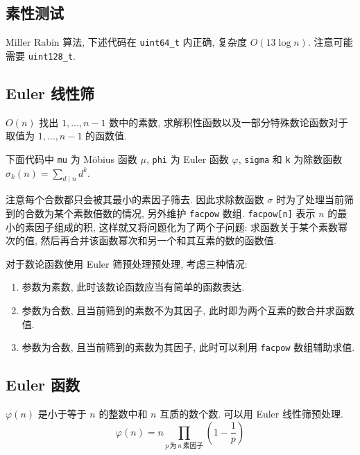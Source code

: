 \subsection{素性测试}
Miller Rabin 算法, 下述代码在 \lstinline{uint64_t} 内正确, 复杂度 $O(13\log n)$. 注意可能需要 \lstinline{uint128_t}.


\subsection{Euler 线性筛}
$O(n)$ 找出 $1,\dots,n-1$ 数中的素数, 求解积性函数以及一部分特殊数论函数对于取值为 $1,\dots,n-1$ 的函数值.

下面代码中 \lstinline{mu} 为 Möbius 函数 $\mu$, \lstinline{phi} 为 Euler 函数 $\varphi$, \lstinline{sigma} 和 \lstinline{k} 为除数函数 $\displaystyle\sigma_k(n)=\sum_{d\mid n}d^k$.

注意每个合数都只会被其最小的素因子筛去. 因此求除数函数 $\sigma$ 时为了处理当前筛到的合数为某个素数倍数的情况, 另外维护 \lstinline{facpow} 数组. \lstinline{facpow[n]} 表示 $n$ 的最小的素因子组成的积, 这样就又将问题化为了两个子问题: 求函数关于某个素数幂次的值, 然后再合并该函数幂次和另一个和其互素的数的函数值.

对于数论函数使用 Euler 筛预处理预处理, 考虑三种情况:

\begin{enumerate}
  \item 参数为素数, 此时该数论函数应当有简单的函数表达.
  \item 参数为合数, 且当前筛到的素数不为其因子, 此时即为两个互素的数合并求函数值.
  \item 参数为合数, 且当前筛到的素数为其因子, 此时可以利用 \lstinline{facpow} 数组辅助求值.
\end{enumerate}



\subsection{Euler 函数}
$\varphi(n)$ 是小于等于 $n$ 的整数中和 $n$ 互质的数个数. 可以用 Euler 线性筛预处理.
\[\varphi(n)=n\prod_{p\,\text{为}\,n\,\text{素因子}}\left(1-\frac1p\right)\]
